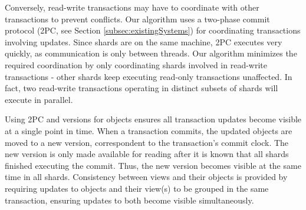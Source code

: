 Conversely, read-write transactions may have to coordinate with other transactions to prevent conflicts.
Our algorithm uses a two-phase commit protocol (2PC, see Section \ref{subsec:existingSystems}) for coordinating transactions involving updates.
Since shards are on the same machine, 2PC executes very quickly, as communication is only between threads.
Our algorithm minimizes the required coordination by only coordinating shards involved in read-write transactions - other shards keep executing read-only transactions unaffected. 
In fact, two read-write transactions operating in distinct subsets of shards will execute in parallel.


Using 2PC and versions for objects ensures all transaction updates become visible at a single point in time.
When a transaction commits, the updated objects are moved to a new version, correspondent to the transaction's commit clock.
The new version is only made available for reading after it is known that all shards finished executing the commit.
Thus, the new version becomes visible at the same time in all shards.
Consistency between views and their objects is provided by requiring updates to objects and their view(s) to be grouped in the same transaction, ensuring updates to both become visible simultaneously.

